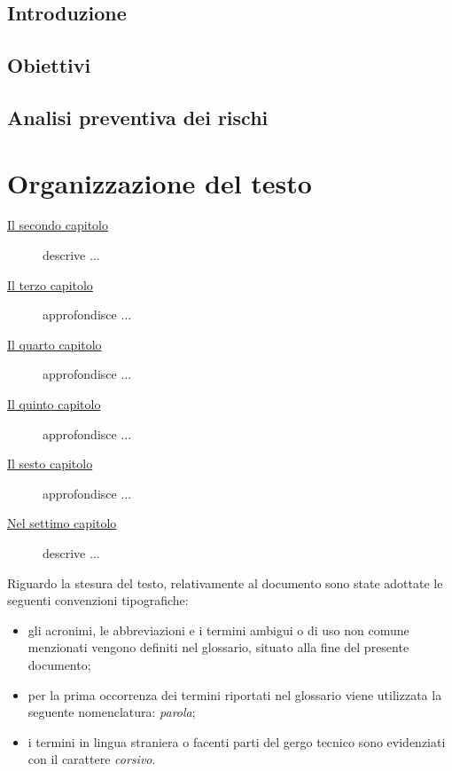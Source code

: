 \subsection{Introduzione}

\subsection{Obiettivi}

\subsection{Analisi preventiva dei rischi}

\section{Organizzazione del testo}

\begin{description}
    \item[{\hyperref[cap:studio-fattibilita]{Il secondo capitolo}}] descrive ...
    
    \item[{\hyperref[cap:descrizione-stage]{Il terzo capitolo}}] approfondisce ...
    
    \item[{\hyperref[cap:analisi-requisiti]{Il quarto capitolo}}] approfondisce ...
    
    \item[{\hyperref[cap:progettazione-codifica]{Il quinto capitolo}}] approfondisce ...
    
    \item[{\hyperref[cap:verifica-validazione]{Il sesto capitolo}}] approfondisce ...
    
    \item[{\hyperref[cap:conclusioni]{Nel settimo capitolo}}] descrive ...
\end{description}

Riguardo la stesura del testo, relativamente al documento sono state adottate le seguenti convenzioni tipografiche:
\begin{itemize}
	\item gli acronimi, le abbreviazioni e i termini ambigui o di uso non comune menzionati vengono definiti nel glossario, situato alla fine del presente documento;
	\item per la prima occorrenza dei termini riportati nel glossario viene utilizzata la seguente nomenclatura: \emph{parola}\glsfirstoccur;
	\item i termini in lingua straniera o facenti parti del gergo tecnico sono evidenziati con il carattere \emph{corsivo}.
\end{itemize}